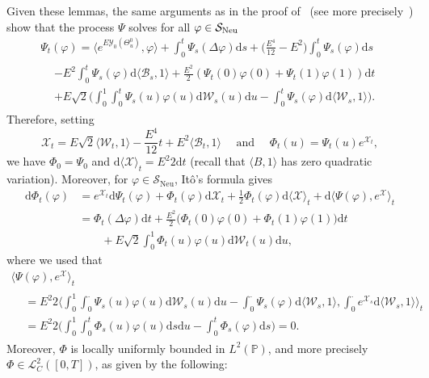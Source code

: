 \documentclass[10pt]{amsart}
\theoremstyle{definition}\newtheorem{defi}[theo]{Definition}\newtheorem{rema}[theo]{Remark}\newtheorem{exam}[theo]{Example}\newtheorem{exem}[theo]{Example}\newtheorem{nota}[theo]{Notation}
\DeclareMathOperator{\Neu}{Neu}
\newcommand{\bb}[1]{{\mathbb #1}}
\newcommand{\mc}[1]{{\mathcal #1}}
\renewcommand{\mc}[1]{{\mathcal #1}}
\newcommand{\SN}{\ensuremath{\mc S_{\Neu}}}
\newcommand*{\dd}{\mathrm{d}}
\newcommand*{\ds}{\dd s}
\newcommand*{\dt}{\dd t}
\newcommand*{\du}{\dd u}
\begin{document}
Given these lemmas, the same arguments as in the proof of~\cite[Theorem~2.4]{Gubinelli2015Energy} (see more precisely~\cite[Section~4.1]{Gubinelli2015Energy}) show that the process $\Psi$ solves for all $\varphi \in \mc \SN$
\begin{multline*}
\Psi_t (\varphi) = \big\langle e^{E \mc Y_0 (\Theta^0_u)}, \varphi \big\rangle +
\int_0^t \Psi_s (\Delta \varphi) \ds + \bigg(\frac{E^4}{12} - E^2\bigg) \int_0^t \Psi_s (\varphi) \ds \\
\begin{aligned}
& - E^2 \int_0^t \Psi_s (\varphi) \dd \langle \mathcal{B}_s, 1 \rangle  + \frac{E^2}{2} (\Psi_t(0)\varphi(0) + \Psi_t(1)\varphi(1))\dt\\
& + E \sqrt{2} \bigg(
\int_0^1 \int_0^t \Psi_s (u) \varphi (u) \dd\mc W_s (u) \du - \int_0^t
\Psi_s (\varphi) \dd \langle \mc W_s, 1 \rangle \bigg).
\end{aligned}
\end{multline*}
Therefore, setting
\begin{equation}\label{eq:Z-def}
\mc X_t = E \sqrt{2} \langle \mc W_t, 1 \rangle - \frac{E^4}{12} t + E^2 \langle \mathcal{B}_t, 1 \rangle \quad \text{ and } \quad \Phi_t (u) = \Psi_t (u) e^{\mc X_t},
\end{equation}
we have $\Phi_0 = \Psi_0$ and $\dd \langle \mc X\rangle_t = E^2 2 \dt$ (recall that $\langle B, 1 \rangle$ has zero quadratic variation). Moreover, for $\varphi \in \SN$, It\^o's formula gives
\begin{align*}
\dd \Phi_t (\varphi) & = e^{\mc X_t} \dd \Psi_t (\varphi) + \Phi_t (\varphi) \dd\mc X_t + \frac{1}{2} \Phi_t (\varphi) \dd \langle \mc X \rangle_t + \dd \langle \Psi (\varphi), e^{\mc X} \rangle_t\\
& = \Phi_t (\Delta \varphi) \dt + \frac{E^2}{2} \big(\Phi_t(0)\varphi(0) + \Phi_t(1)\varphi(1)\big)\dt \\
& \qquad + E \sqrt{2} \int_0^1 \Phi_t (u)
\varphi (u) \dd\mc W_t (u) \du,
\end{align*}
where we used that
\begin{multline*}
\langle \Psi (\varphi), e^{\mc X} \rangle_t \\
\begin{aligned}
& = E^2 2 \bigg\langle
\int_0^1 \int_0^\cdot \Psi_s (u) \varphi (u) \dd\mc W_s (u) \du - \int_0^\cdot
\Psi_s (\varphi) \dd \langle \mc W_s, 1 \rangle, \int_0^\cdot e^{\mc X_s} \dd \langle \mc W_s, 1\rangle \bigg\rangle_t \\
&= E^2 2 \bigg(\int_0^1 \int_0^t \Phi_s (u) \varphi (u) \ds \du - \int_0^t
\Phi_s (\varphi) \ds \bigg) = 0.
\end{aligned}
\end{multline*}
Moreover, $\Phi$ is locally uniformly bounded in $L^2(\bb P)$, and more precisely $\Phi \in \mc L_C^2([0,T])$, as given by the following:
\end{document}

